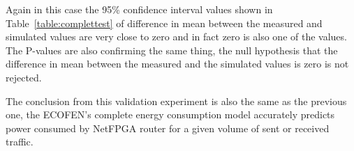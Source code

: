 Again in this case the 95\% confidence interval values shown in Table~\ref{table:complettest} of difference in mean between the measured and simulated values are very close to zero and in fact zero is also one of the values. The P-values are also confirming the same thing, the null hypothesis that the difference in mean between the measured and the simulated values is zero is not rejected. 

The conclusion from this validation experiment is also the same as the previous one, the ECOFEN's complete energy consumption model accurately predicts power consumed by NetFPGA router for a given volume of sent or received traffic.  

 

